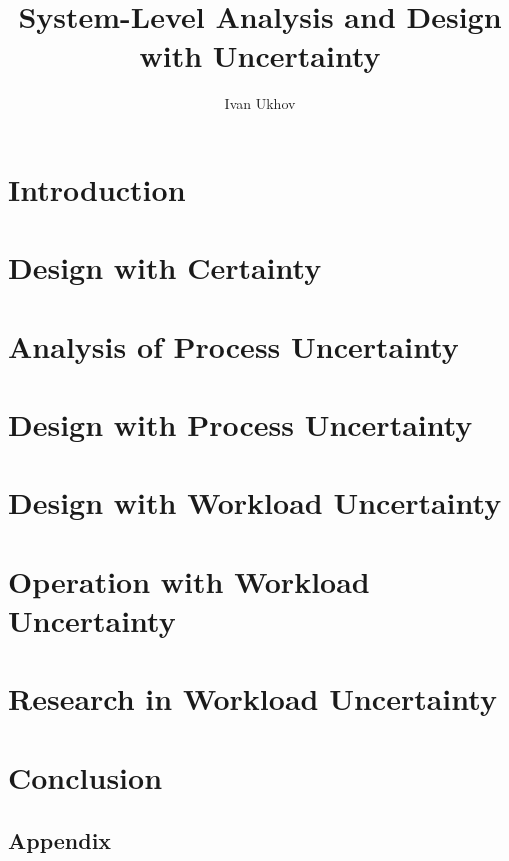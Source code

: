 \documentclass{thesis}
\title{System-Level Analysis and Design with Uncertainty}
\author{Ivan Ukhov}
\begin{document}
\nocite{ukhov2012, ukhov2014a, ukhov2014b, ukhov2015, ukhov2017a, ukhov2017b}

\chapter{Introduction}
\newcommand{\inputsection}{}


\chapter{Design with Certainty}
\renewcommand{\inputsection}[1]{}


\chapter{Analysis of Process Uncertainty}
\renewcommand{\inputsection}[1]{}


\chapter{Design with Process Uncertainty}
\renewcommand{\inputsection}[1]{}


\chapter{Design with Workload Uncertainty}
\renewcommand{\inputsection}[1]{}


\chapter{Operation with Workload Uncertainty}
\renewcommand{\inputsection}[1]{}


\chapter{Research in Workload Uncertainty}
\renewcommand{\inputsection}[1]{}


\chapter{Conclusion}


\begin{appendices}
\chapter{Appendix}
\renewcommand{\inputsection}[1]{}

\end{appendices}

\printbibliography
\end{document}
